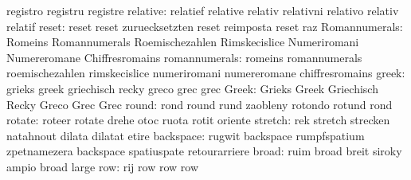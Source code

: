                            registro                  registru
                           registre
                 relative: relatief                  relative
                           relativ                   relativni
                           relativo                  relativ
                           relatif
                    reset: reset                     reset
                           zuruecksetzten            reset
                           reimposta                 reset
                           raz
            Romannumerals: Romeins                   Romannumerals
                           Roemischezahlen           Rimskecislice
                           Numeriromani              Numereromane
                           Chiffresromains
            romannumerals: romeins                   romannumerals
                           roemischezahlen           rimskecislice
                           numeriromani              numereromane
                           chiffresromains
                    greek: grieks                    greek
                           griechisch                recky
                           greco                     grec
                           grec
                    Greek: Grieks                    Greek
                           Griechisch                Recky
                           Greco                     Grec
                           Grec
                    round: rond                      round
                           rund                      zaobleny
                           rotondo                   rotund
                           rond
                   rotate: roteer                    rotate
                           drehe                     otoc
                           ruota                     rotit
                           oriente
                  stretch: rek                       stretch
                           strecken                  natahnout
                           dilata                    dilatat
                           etire
                backspace: rugwit                    backspace
                           rumpfspatium              zpetnamezera
                           backspace                 spatiuspate
                           retourarriere
                    broad: ruim                      broad
                           breit                     siroky
                           ampio                     broad
                           large
                      row: rij                       row
                           row                       row
